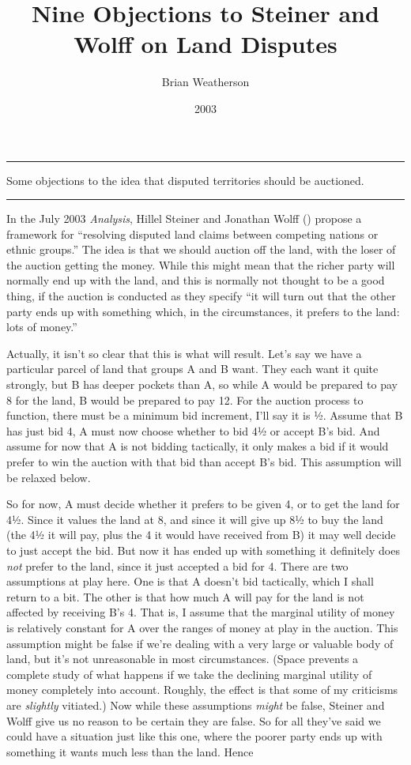 \documentclass[
  10pt,
  letterpaper,
  DIV=11,
  numbers=noendperiod,
  twoside]{scrartcl}
\title{Nine Objections to Steiner and Wolff on Land Disputes}
\author{Brian Weatherson}
\date{2003}
\renewenvironment{abstract}
 {\vspace{-1.25cm}
 \quotation\small\noindent\rule{\linewidth}{.5pt}\par\smallskip
 \noindent }
 {\par\noindent\rule{\linewidth}{.5pt}\endquotation}
\begin{document}
\maketitle
\begin{abstract}
Some objections to the idea that disputed territories should be
auctioned.
\end{abstract}

In the July 2003 \emph{Analysis}, Hillel Steiner and Jonathan Wolff
() propose a framework for ``resolving
disputed land claims between competing nations or ethnic groups.'' The
idea is that we should auction off the land, with the loser of the
auction getting the money. While this might mean that the richer party
will normally end up with the land, and this is normally not thought to
be a good thing, if the auction is conducted as they specify ``it will
turn out that the other party ends up with something which, in the
circumstances, it prefers to the land: lots of money.''

Actually, it isn't so clear that this is what will result. Let's say we
have a particular parcel of land that groups A and B want. They each
want it quite strongly, but B has deeper pockets than A, so while A
would be prepared to pay 8 for the land, B would be prepared to pay 12.
For the auction process to function, there must be a minimum bid
increment, I'll say it is ½. Assume that B has just bid 4, A must now
choose whether to bid 4½ or accept B's bid. And assume for now that A is
not bidding tactically, it only makes a bid if it would prefer to win
the auction with that bid than accept B's bid. This assumption will be
relaxed below.

So for now, A must decide whether it prefers to be given 4, or to get
the land for 4½. Since it values the land at 8, and since it will give
up 8½ to buy the land (the 4½ it will pay, plus the 4 it would have
received from B) it may well decide to just accept the bid. But now it
has ended up with something it definitely does \emph{not} prefer to the
land, since it just accepted a bid for 4. There are two assumptions at
play here. One is that A doesn't bid tactically, which I shall return to
a bit. The other is that how much A will pay for the land is not
affected by receiving B's 4. That is, I assume that the marginal utility
of money is relatively constant for A over the ranges of money at play
in the auction. This assumption might be false if we're dealing with a
very large or valuable body of land, but it's not unreasonable in most
circumstances. (Space prevents a complete study of what happens if we
take the declining marginal utility of money completely into account.
Roughly, the effect is that some of my criticisms are \emph{slightly}
vitiated.) Now while these assumptions \emph{might} be false, Steiner
and Wolff give us no reason to be certain they are false. So for all
they've said we could have a situation just like this one, where the
poorer party ends up with something it wants much less than the land.
Hence
\end{document}
